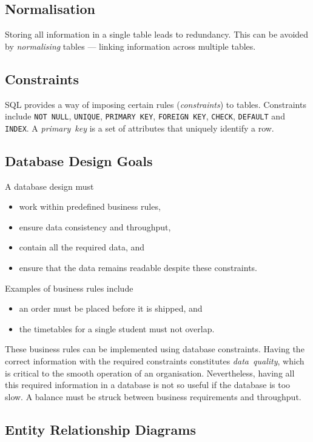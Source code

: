 \subsection{Normalisation}

Storing all information in a single table leads to redundancy.
This can be avoided by \emph{normalising} tables --- linking information across multiple tables.

\subsection{Constraints}

SQL provides a way of imposing certain rules (\emph{constraints}) to tables.
Constraints include \texttt{NOT~NULL}, \texttt{UNIQUE}, \texttt{PRIMARY~KEY}, \texttt{FOREIGN~KEY}, \texttt{CHECK}, \texttt{DEFAULT} and \texttt{INDEX}.
A \emph{primary~key} is a set of attributes that uniquely identify a row.

\subsection{Database Design Goals}

A database design must
\begin{itemize}
  \item work within predefined business rules,
  \item ensure data consistency and throughput,
  \item contain all the required data, and
  \item ensure that the data remains readable despite these constraints.
\end{itemize}

Examples of business rules include
\begin{itemize}
  \item an order must be placed before it is shipped, and
  \item the timetables for a single student must not overlap.
\end{itemize}
These business rules can be implemented using database constraints.
Having the correct information with the required constraints constitutes \emph{data~quality}, which is critical to the smooth operation of an organisation.
Nevertheless, having all this required information in a database is not so useful if the database is too slow.
A balance must be struck between business requirements and throughput.

\subsection{Entity Relationship Diagrams}

